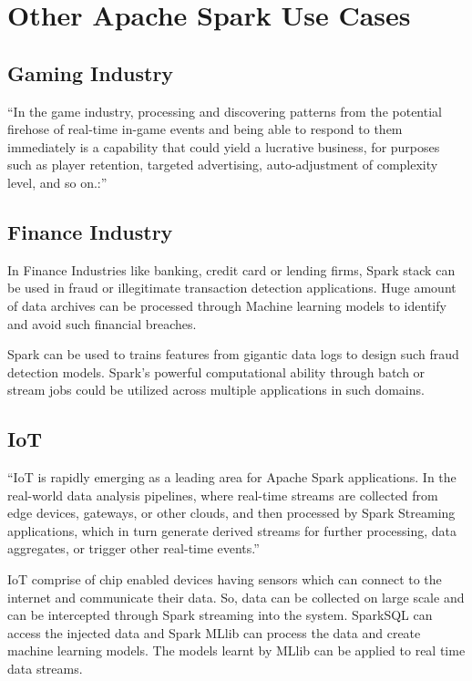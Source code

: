\section{Other Apache Spark Use Cases}

\subsection{Gaming Industry}

``In the game industry, processing and discovering patterns from the potential firehose of real-time in-game
events and being able to respond to them immediately is a capability that could yield a lucrative business,
for purposes such as player retention, targeted advertising, auto-adjustment of complexity level,
and so on.:''~\cite{hid-sp18-522-deepcore}

\subsection{Finance Industry}

In Finance Industries like banking, credit card or lending firms, Spark stack can be used in fraud or illegitimate
transaction detection applications. Huge amount of data archives can be processed through Machine learning
models to identify and avoid such financial breaches.

Spark can be used to trains features from gigantic data logs to design such fraud detection models. Spark's powerful
computational ability through batch or stream jobs could be utilized across multiple applications in such domains.


\subsection{IoT}

``IoT is rapidly emerging as a leading area for Apache Spark applications. In the real-world data analysis
pipelines, where real-time streams are collected from edge devices, gateways, or other clouds, and then
processed by Spark Streaming applications, which in turn generate derived streams for further processing,
data aggregates, or trigger other real-time events.''~\cite{hid-sp18-522-IoT}

IoT comprise of chip enabled devices having sensors which can connect to the internet and communicate their data.
So, data can be collected on large scale and can be intercepted through Spark streaming into the system.
SparkSQL can access the injected data and Spark MLlib can process the data and create machine learning models.
The models learnt by MLlib can be applied to real time data streams.


